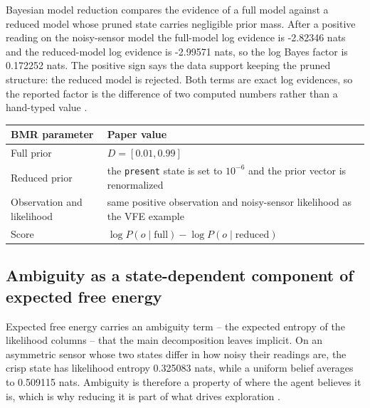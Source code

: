 \documentclass[
  english,
]{article}
\newcounter{none} %
\begin{document}
Bayesian model reduction compares the evidence of a full model against a
reduced model whose pruned state carries negligible prior mass. After a
positive reading on the noisy-sensor model the full-model log evidence
is -2.82346 nats and the reduced-model log evidence is -2.99571 nats, so
the log Bayes factor is 0.172252 nats. The positive sign says the data
support keeping the pruned structure: the reduced model is rejected.
Both terms are exact log evidences, so the reported factor is the
difference of two computed numbers rather than a hand-typed value
\citep{friston2018bayesian_model_reduction, parr2022active}.

{\def\LTcaptype{none} %
\begin{longtable}[]{@{}
  >{\raggedright\arraybackslash}p{}
  >{\raggedright\arraybackslash}p{}@{}}
\toprule\noalign{}
\begin{minipage}[b]{\linewidth}\raggedright
BMR parameter
\end{minipage} & \begin{minipage}[b]{\linewidth}\raggedright
Paper value
\end{minipage} \\
\midrule\noalign{}
\endhead
\bottomrule\noalign{}
\endlastfoot
Full prior & \(D=[0.01, 0.99]\) \\
Reduced prior & the \texttt{present} state is set to \(10^{-6}\) and the
prior vector is renormalized \\
Observation and likelihood & same positive observation and noisy-sensor
likelihood as the VFE example \\
Score & \(\log P(o\mid\mathrm{full})-\log P(o\mid\mathrm{reduced})\) \\
\end{longtable}
}

\subsection{Ambiguity as a state-dependent component of expected free
energy}\label{ambiguity-as-a-state-dependent-component-of-expected-free-energy}

Expected free energy carries an ambiguity term -- the expected entropy
of the likelihood columns -- that the main decomposition leaves
implicit. On an asymmetric sensor whose two states differ in how noisy
their readings are, the crisp state has likelihood entropy 0.325083
nats, while a uniform belief averages to 0.509115 nats. Ambiguity is
therefore a property of where the agent believes it is, which is why
reducing it is part of what drives exploration
\citep{parr2022active, sajid2021demystified}.
\end{document}
